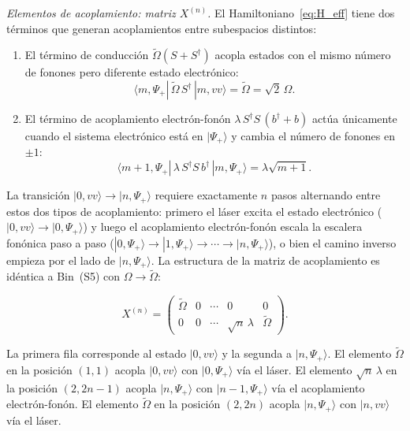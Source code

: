 \documentclass[12pt]{article}
\begin{document}
	\noindent
	\textit{Elementos de acoplamiento: matriz $X^{(n)}$.}
	El Hamiltoniano~\eqref{eq:H_eff} tiene dos t\'erminos que generan acoplamientos
	entre subespacios distintos:
	
	\begin{enumerate}
		\item El t\'ermino de conducci\'on $\widetilde{\Omega}(S + S^\dagger)$ acopla
		estados con el mismo n\'umero de fonones pero diferente estado electr\'onico:
		\begin{equation}
			\langle m, \Psi_+|\,\widetilde{\Omega}\,S^\dagger\,|m, vv\rangle = \widetilde{\Omega}
			= \sqrt{2}\,\Omega.
			\label{eq:acop_laser}
		\end{equation}
		
		\item El t\'ermino de acoplamiento electr\'on-fon\'on
		$\lambda\,S^\dagger S\,(b^\dagger + b)$ act\'ua \'unicamente cuando el
		sistema electr\'onico est\'a en $|\Psi_+\rangle$ y cambia el n\'umero de
		fonones en $\pm 1$:
		\begin{equation}
			\langle m+1, \Psi_+|\,\lambda\,S^\dagger S\,b^\dagger\,|m, \Psi_+\rangle
			= \lambda\sqrt{m+1}.
			\label{eq:acop_fonon}
		\end{equation}
	\end{enumerate}
	
	\noindent
	La transici\'on $|0, vv\rangle \to |n, \Psi_+\rangle$ requiere exactamente $n$
	pasos alternando entre estos dos tipos de acoplamiento: primero el l\'aser
	excita el estado electr\'onico ($|0,vv\rangle \to |0,\Psi_+\rangle$) y luego
	el acoplamiento electr\'on-fon\'on escala la escalera fon\'onica paso a paso
	($|0,\Psi_+\rangle \to |1,\Psi_+\rangle \to \cdots \to |n,\Psi_+\rangle$),
	o bien el camino inverso empieza por el lado de $|n,\Psi_+\rangle$.
	La estructura de la matriz de acoplamiento es id\'entica a Bin~(S5) con
	$\Omega \to \widetilde{\Omega}$:
	
	\begin{equation}
		X^{(n)} = \begin{pmatrix}
			\widetilde{\Omega} & 0 & \cdots & 0 & 0 \\
			0 & 0 & \cdots & \sqrt{n}\,\lambda & \widetilde{\Omega}
		\end{pmatrix}.
		\label{eq:X_n}
	\end{equation}
	
	\noindent
	La primera fila corresponde al estado $|0, vv\rangle$ y la segunda a
	$|n, \Psi_+\rangle$. El elemento $\widetilde{\Omega}$ en la posici\'on $(1,1)$
	acopla $|0, vv\rangle$ con $|0, \Psi_+\rangle$ v\'ia el l\'aser. El elemento
	$\sqrt{n}\,\lambda$ en la posici\'on $(2, 2n-1)$ acopla $|n, \Psi_+\rangle$
	con $|n-1, \Psi_+\rangle$ v\'ia el acoplamiento electr\'on-fon\'on. El
	elemento $\widetilde{\Omega}$ en la posici\'on $(2, 2n)$ acopla
	$|n, \Psi_+\rangle$ con $|n, vv\rangle$ v\'ia el l\'aser.
	
\end{document}
